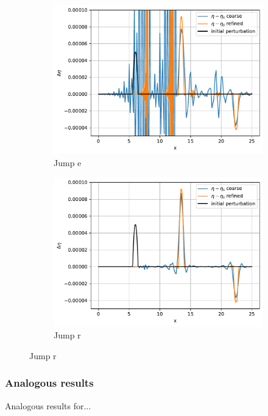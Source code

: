 \documentclass[pt12]{beamer}
\begin{document}
\begin{frame}
\begin{figure}
\begin{subfigure}[b]{0.28\textwidth}
         \includegraphics[width=\textwidth]{alb_sup_same_scale_WBp3s14je.pdf}
         \caption{Jump e}
     \end{subfigure}
     \begin{subfigure}[b]{0.28\textwidth}
         \centering
         \includegraphics[width=\textwidth]{alb_sup_same_scale_WBp3s14jr.pdf}
         \caption{Jump r}
     \end{subfigure}
        \label{pert_super_jumps}
\end{figure}
\end{frame}



\begin{frame}
\frametitle{Analogous results}


Analogous results for...

\end{frame}
\end{document}
